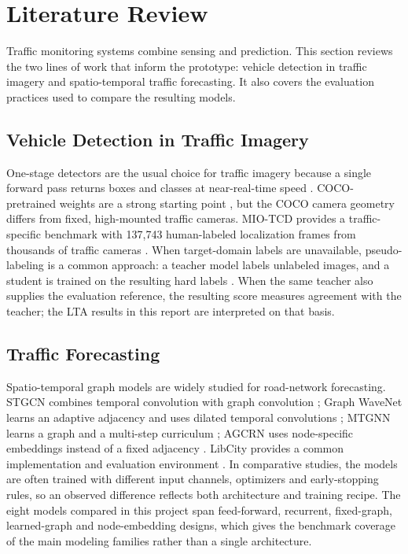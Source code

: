 \section{Literature Review}\label{sec:literature}

Traffic monitoring systems combine sensing and prediction. This section reviews
the two lines of work that inform the prototype: vehicle detection in traffic
imagery and spatio-temporal traffic forecasting. It also covers the evaluation
practices used to compare the resulting models.

\subsection{Vehicle Detection in Traffic Imagery}\label{sec:literature-detection}

One-stage detectors are the usual choice for traffic imagery because a single
forward pass returns boxes and classes at near-real-time speed
\parencite{ultralytics2026yolo}. COCO-pretrained weights are a strong starting
point \parencite{lin2014coco}, but the COCO camera geometry differs from fixed,
high-mounted traffic cameras. MIO-TCD provides a traffic-specific benchmark with
137,743 human-labeled localization frames from thousands of traffic cameras
\parencite{luo2018miotcd}. When target-domain
labels are unavailable, pseudo-labeling is a common approach: a teacher model
labels unlabeled images, and a student is trained on the resulting hard labels
\parencite{lee2013pseudo}. When the same teacher also supplies the evaluation
reference, the resulting score measures agreement with the teacher; the LTA
results in this report are interpreted on that basis.

\subsection{Traffic Forecasting}\label{sec:literature-forecasting}

Spatio-temporal graph models are widely studied for road-network forecasting.
STGCN combines temporal convolution with graph convolution
\parencite{yu2018stgcn}; Graph WaveNet learns an adaptive adjacency and uses
dilated temporal convolutions \parencite{wu2019gwnet}; MTGNN learns a graph and a
multi-step curriculum \parencite{wu2020mtgnn}; AGCRN uses node-specific
embeddings instead of a fixed adjacency \parencite{bai2020agcrn}. LibCity
provides a common implementation and evaluation environment
\parencite{wang2021libcity,jiang2023libcity}. In comparative studies, the models
are often trained with different input channels, optimizers and early-stopping
rules, so an observed difference reflects both architecture and training
recipe. The eight models compared in this project span feed-forward, recurrent,
fixed-graph, learned-graph and node-embedding designs, which gives the benchmark
coverage of the main modeling families rather than a single architecture.


